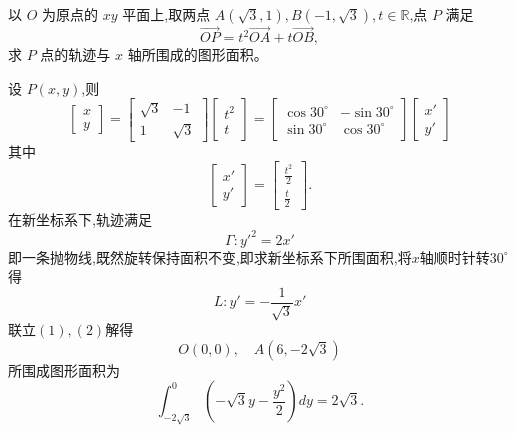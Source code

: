 \begin{questions}
    \question 以 $O$ 为原点的 $xy$ 平面上,取两点 $A(\sqrt{3},1),B(-1,\sqrt{3}),t \in \mathbb{R}$,点 $P$ 满足
    \[
    \overrightarrow{OP} = t^2 \overrightarrow{OA} + t \overrightarrow{OB},
    \]
    求 $P$ 点的轨迹与 $x$ 轴所围成的图形面积。
    \begin{solution}
        设 $P(x,y)$,则
        \[
        \begin{bmatrix} x \\ y \end{bmatrix} = 
        \begin{bmatrix}
        \sqrt{3} & -1 \\
        1 & \sqrt{3}
        \end{bmatrix}
        \begin{bmatrix}
        t^2 \\ t
        \end{bmatrix}=
        \begin{bmatrix}
        \cos 30^\circ & -\sin 30^\circ \\
        \sin 30^\circ & \cos 30^\circ
        \end{bmatrix}
        \begin{bmatrix}
        x' \\ y'
        \end{bmatrix}
        \]
        其中
        \[
        \begin{bmatrix} x' \\ y' \end{bmatrix} =
        \begin{bmatrix}
        \frac{t^2}{2} \\
        \frac{t}{2}
        \end{bmatrix}.
        \]
        在新坐标系下,轨迹满足
        \[
        \Gamma: y'^2 = 2 x' \tag{1}
        \]
        即一条抛物线,既然旋转保持面积不变,即求新坐标系下所围面积,将$x$轴顺时针转$30^\circ$得
        \[
        L: y' = -\frac{1}{\sqrt{3}} x' \tag{2}
        \]
        联立$(1),(2)$解得
        \[
        O(0,0), \quad A(6, -2 \sqrt{3})
        \]
        所围成图形面积为
        \[
        \int_{-2\sqrt{3}}^{0} \left(-\sqrt{3} y - \frac{y^2}{2}\right) dy = 2 \sqrt{3}.
        \]
    \end{solution}


\end{questions}
